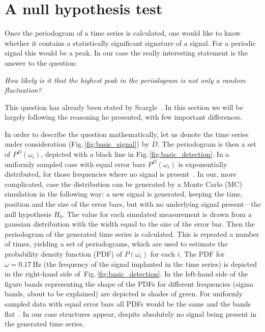 \section{A null hypothesis test}
\label{sec:a_null_hypothesis_test}
Once the periodogram of a time series is calculated, one would like to know whether it contains a statistically significant signature of a signal.
For a periodic signal this would be a peak.
In our case the really interesting statement is the answer to the question:
\begin{center}
  \emph{How likely is it that the highest peak in the periodogram is not only a random fluctuation?}
\end{center}
This question has already been stated by Scargle~\cite{Scargle1982}.
In this section we will be largely following the reasoning he presented, with few important differences.

In order to describe the question mathematically, let us denote the time series under consideration (Fig.\,\ref{fig:basic_signal}) by $D$.
The periodogram is then a set of $P^D(\omega_i)$, depicted with a black line in Fig.\,\ref{fig:basic_detection}.
In a uniformly sampled case with equal error bars $P^D(\omega_i)$ is exponentially distributed, for those frequencies where no signal is present~\cite{Scargle1982}.
In our, more complicated, case the distribution can be generated by a Monte Carlo (MC) simulation in the following way: a new signal is generated, keeping the time, position and the size of the error bars, but with no underlying signal present---the null hypothesis $H_0$.
The value for each simulated measurement is drawn from a gaussian distribution with the width equal to the size of the error bar.
Then the periodogram of the generated time series is calculated.
This is repeated a number of times, yielding a set of periodograms, which are used to estimate the probability density function (PDF) of $P(\omega_i)$ for each $i$.
The PDF for $\omega = \SI{0.17}{\hertz}$ (the frequency of the signal implanted in the time series) is depicted in the right-hand side of~Fig.\,\ref{fig:basic_detection}.
In the left-hand side of the figure bands representing the shape of the PDFs for different frequencies (sigma bands, about to be explained) are depicted is shades of green.
For uniformly sampled data with equal error bars all PDFs would be the same and the bands flat~\cite{Scargle1982}.
In our case structures appear, despite absolutely no signal being present in the generated time series.

